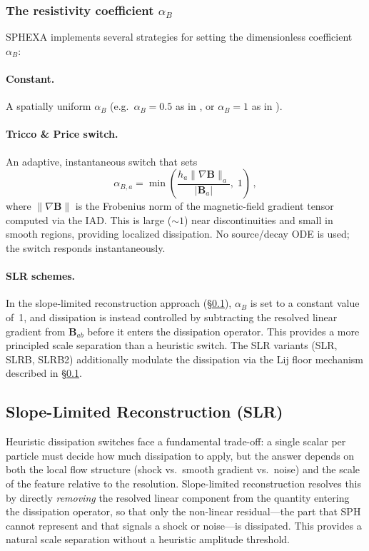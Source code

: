 \subsubsection*{The resistivity coefficient $\alpha_B$}

SPHEXA implements several strategies for setting the dimensionless coefficient $\alpha_B$:

\paragraph{Constant.} A spatially uniform $\alpha_B$ (e.g.\ $\alpha_B = 0.5$ as in \cite{Wissing2020}, or $\alpha_B = 1$ as in \cite{Price2018}).

\paragraph{Tricco \& Price switch.} An adaptive, instantaneous switch \cite{TriccoPrice2013} that sets
\begin{equation}
    \alpha_{B,a} = \min\!\left(\frac{h_a \|\nabla \mathbf{B}\|_a}{|\mathbf{B}_a|},\; 1\right)\,,
    \label{eq:tp_switch}
\end{equation}
where $\|\nabla \mathbf{B}\|$ is the Frobenius norm of the magnetic-field gradient tensor computed via the IAD. This is large ($\sim 1$) near discontinuities and small in smooth regions, providing localized dissipation. No source/decay ODE is used; the switch responds instantaneously.

\paragraph{SLR schemes.} In the slope-limited reconstruction approach (\S\ref{sec:slr}), $\alpha_B$ is set to a constant value of~1, and dissipation is instead controlled by subtracting the resolved linear gradient from $\mathbf{B}_{ab}$ before it enters the dissipation operator. This provides a more principled scale separation than a heuristic switch. The SLR variants (SLR, SLRB, SLRB2) additionally modulate the dissipation via the Lij floor mechanism described in \S\ref{sec:slr}.


\subsection{Slope-Limited Reconstruction (SLR)}
\label{sec:slr}

Heuristic dissipation switches face a fundamental trade-off: a single scalar per particle must decide how much dissipation to apply, but the answer depends on both the local flow structure (shock vs.\ smooth gradient vs.\ noise) and the scale of the feature relative to the resolution. Slope-limited reconstruction \cite{Cabezon2026} resolves this by directly \emph{removing} the resolved linear component from the quantity entering the dissipation operator, so that only the non-linear residual---the part that SPH cannot represent and that signals a shock or noise---is dissipated. This provides a natural scale separation without a heuristic amplitude threshold.


